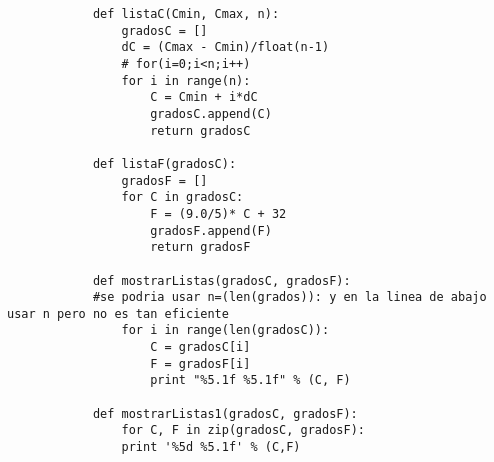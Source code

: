 \documentclass[letterpaper, 12pt, oneside]{article}
\begin{document}
\begin{enumerate}
\begin{enumerate}
			\begin{verbatim}
			def listaC(Cmin, Cmax, n):
				gradosC = []
				dC = (Cmax - Cmin)/float(n-1)
				# for(i=0;i<n;i++)
				for i in range(n):
					C = Cmin + i*dC
					gradosC.append(C)
					return gradosC
			
			def listaF(gradosC):
				gradosF = []
				for C in gradosC:
					F = (9.0/5)* C + 32
					gradosF.append(F)
					return gradosF
			
			def mostrarListas(gradosC, gradosF):
			#se podria usar n=(len(grados)): y en la linea de abajo usar n pero no es tan eficiente
				for i in range(len(gradosC)):
					C = gradosC[i]
					F = gradosF[i]
					print "%5.1f %5.1f" % (C, F)
			
			def mostrarListas1(gradosC, gradosF):
				for C, F in zip(gradosC, gradosF):
				print '%5d %5.1f' % (C,F)		
			\end{verbatim}
			
		
		\end{enumerate}
	\end{enumerate}
\end{document}
